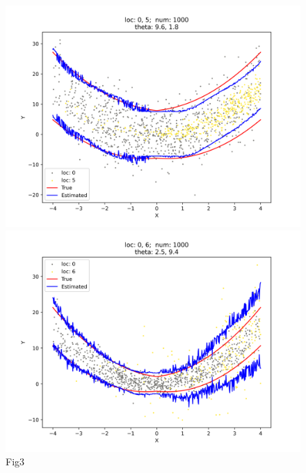 \documentclass[12pt, a4paper, oneside]{article}
\begin{document}
\begin{figure}[htbp]
\begin{minipage}{0.495\linewidth}
            \centering
            \includegraphics[width=0.98\linewidth]{fig/Ex1_2/0_5.png}
        \end{minipage}
        \begin{minipage}{0.495\linewidth}
            \centering
            \includegraphics[width=0.98\linewidth]{fig/Ex1_2/0_6.png}
        \end{minipage}
        \caption{Fig3}
        \label{Fig3}
    \end{figure}
\end{document}

